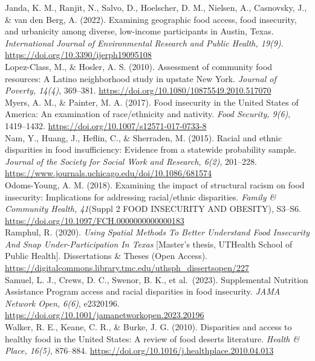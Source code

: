\documentclass[
]{article}
\begin{document}
Janda, K. M., Ranjit, N., Salvo, D., Hoelscher, D. M., Nielsen, A.,
Casnovsky, J., \& van den Berg, A. (2022). Examining geographic food
access, food insecurity, and urbanicity among diverse, low-income
participants in Austin, Texas. \emph{International Journal of
Environmental Research and Public Health, 19(9)}.
\url{https://doi.org/10.3390/ijerph19095108}\\
Lopez-Class, M., \& Hosler, A. S. (2010). Assessment of community food
resources: A Latino neighborhood study in upstate New York.
\emph{Journal of Poverty, 14(4)}, 369--381.
\url{https://doi.org/10.1080/10875549.2010.517070}\\
Myers, A. M., \& Painter, M. A. (2017). Food insecurity in the United
States of America: An examination of race/ethnicity and nativity.
\emph{Food Security, 9(6)}, 1419--1432.
\url{https://doi.org/10.1007/s12571-017-0733-8}\\
Nam, Y., Huang, J., Heflin, C., \& Sherraden, M. (2015). Racial and
ethnic disparities in food insufficiency: Evidence from a statewide
probability sample. \emph{Journal of the Society for Social Work and
Research, 6(2)}, 201--228.
\url{https://www.journals.uchicago.edu/doi/10.1086/681574}\\
Odoms-Young, A. M. (2018). Examining the impact of structural racism on
food insecurity: Implications for addressing racial/ethnic disparities.
\emph{Family \& Community Health, 41}(Suppl 2 FOOD INSECURITY AND
OBESITY), S3--S6. \url{https://doi.org/10.1097/FCH.0000000000000183}\\
Ramphul, R. (2020). \emph{Using Spatial Methods To Better Understand
Food Insecurity And Snap Under-Participation In Texas} {[}Master's
thesis, UTHealth School of Public Health{]}. Dissertations \& Theses
(Open Access).
\url{https://digitalcommons.library.tmc.edu/uthsph_dissertsopen/227}\\
Samuel, L. J., Crews, D. C., Swenor, B. K., et al.~(2023). Supplemental
Nutrition Assistance Program access and racial disparities in food
insecurity. \emph{JAMA Network Open, 6(6)}, e2320196.
\url{https://doi.org/10.1001/jamanetworkopen.2023.20196}\\
Walker, R. E., Keane, C. R., \& Burke, J. G. (2010). Disparities and
access to healthy food in the United States: A review of food deserts
literature. \emph{Health \& Place, 16(5)}, 876--884.
\url{https://doi.org/10.1016/j.healthplace.2010.04.013}
\end{document}

